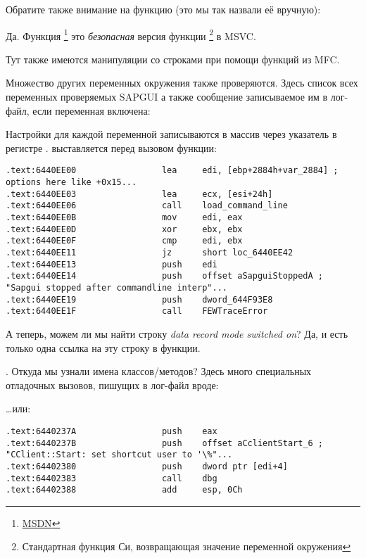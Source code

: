 Обратите также внимание на функцию  (это мы так назвали её вручную):



Да. Функция \footnote{\href{http://go.yurichev.com/17250}{MSDN}} 
это \emph{безопасная} версия функции \footnote{Стандартная функция Си,
возвращающая значение переменной окружения} в MSVC.

Тут также имеются манипуляции со строками при помощи функций из MFC.

Множество других переменных окружения также проверяются. Здесь список всех переменных проверяемых SAPGUI 
а также сообщение записываемое им в лог-файл, если переменная включена:



Настройки для каждой переменной записываются в массив через указатель в регистре \EDI.
\EDI выставляется перед вызовом функции:

\begin{lstlisting}[style=customasmx86]
.text:6440EE00                 lea     edi, [ebp+2884h+var_2884] ; options here like +0x15...
.text:6440EE03                 lea     ecx, [esi+24h]
.text:6440EE06                 call    load_command_line
.text:6440EE0B                 mov     edi, eax
.text:6440EE0D                 xor     ebx, ebx
.text:6440EE0F                 cmp     edi, ebx
.text:6440EE11                 jz      short loc_6440EE42
.text:6440EE13                 push    edi
.text:6440EE14                 push    offset aSapguiStoppedA ; "Sapgui stopped after commandline interp"...
.text:6440EE19                 push    dword_644F93E8
.text:6440EE1F                 call    FEWTraceError
\end{lstlisting}

А теперь, можем ли мы найти строку \emph{data record mode switched on}?
Да, и есть только одна ссылка на эту строку в функции.

\par {}.
Откуда мы узнали имена классов/методов? Здесь много специальных отладочных вызовов, пишущих в лог-файл вроде:



\dots или:

\begin{lstlisting}[style=customasmx86]
.text:6440237A                 push    eax
.text:6440237B                 push    offset aCclientStart_6 ; "CClient::Start: set shortcut user to '\%"...
.text:64402380                 push    dword ptr [edi+4]
.text:64402383                 call    dbg
.text:64402388                 add     esp, 0Ch
\end{lstlisting}

